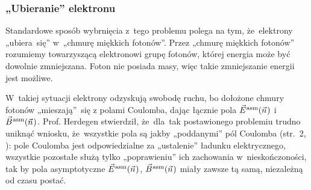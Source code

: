 \documentclass[10pt,t]{beamer}
\begin{document}
\begin{frame}
  \frametitle{„Ubieranie” elektronu}


  Standardowe sposób wybrnięcia z~tego problemu polega na tym, że~elektrony
  „ubiera~się” w~„chmurę miękkich fotonów”. Przez „chmurę miękkich fotonów”
  rozumiemy towarzyszącą elektronowi grupę fotonów, której energia może być
  dowolnie zmniejszana. Foton nie posiada masy, więc takie zmniejszanie
  energii jest możliwe.

  W~takiej sytuacji elektrony odzyskują swobodę ruchu, bo dołożone chmury
  fotonów „mieszają”~się z polami Coulomba, dając łącznie pola
  $\vec{E}^{ \hspace{0.05em} \text{asm} }( \vec{n} \hspace{0.05em} )$ i~$\vec{B}^{ \hspace{0.05em} \text{asm} }( \vec{n} \hspace{0.05em} )$. Prof. Herdegen stwierdził, że~dla~tak
  postawionego problemiu trudno uniknąć wniosku, że~wszystkie pola są jakby
  „poddanymi” pól Coulomba (str.~2,
  \parencite{Herdegen-Infrared-structure-beyond-locality-ETC-Ver-2024}):
  pole Coulomba jest odpowiedzialne za „ustalenie” ładunku
  elektrycznego, wszystkie pozostałe służą tylko „poprawieniu” ich
  zachowania w~nieskończoności, tak by pola asymptotyczne $\vec{E}^{ \hspace{0.05em} \text{asm} }( \vec{n} \hspace{0.05em} )$,
  $\vec{B}^{ \hspace{0.05em} \text{asm} }( \vec{n} \hspace{0.05em} )$ miały zawsze tą samą, niezależną od czasu postać.



\end{frame}
\end{document}
